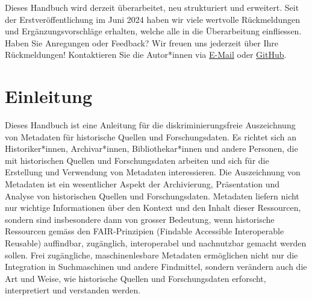\documentclass[
  letterpaper,
  DIV=11,
  numbers=noendperiod]{scrartcl}
\begin{document}
\begin{tcolorbox}[enhanced jigsaw, arc=.35mm, left=2mm, coltitle=black, leftrule=.75mm, bottomrule=.15mm, colframe=quarto-callout-important-color-frame, bottomtitle=1mm, colback=white, toprule=.15mm, toptitle=1mm, opacityback=0, colbacktitle=quarto-callout-important-color!10!white, breakable, rightrule=.15mm, titlerule=0mm, title=\textcolor{quarto-callout-important-color}{\faExclamation}\hspace{0.5em}{Hinweis zur anstehenden Überarbeitung des Handbuchs}, opacitybacktitle=0.6]

Dieses Handbuch wird derzeit überarbeitet, neu strukturiert und
erweitert. Seit der Erstveröffentlichung im Juni 2024 haben wir viele
wertvolle Rückmeldungen und Ergänzungsvorschläge erhalten, welche alle
in die Überarbeitung einfliessen. Haben Sie Anregungen oder Feedback?
Wir freuen uns jederzeit über Ihre Rückmeldungen! Kontaktieren Sie die
Autor*innen via
\href{https://maehr.github.io/diskriminierungsfreie-metadaten/}{E-Mail}
oder
\href{https://github.com/maehr/diskriminierungsfreie-metadaten/discussions/4\#discussioncomment-10626797}{GitHub}.

\end{tcolorbox}

\section{Einleitung}\label{einleitung}

Dieses Handbuch ist eine Anleitung für die diskriminierungsfreie
Auszeichnung von Metadaten für historische Quellen und Forschungsdaten.
Es richtet sich an Historiker*innen, Archivar*innen, Bibliothekar*innen
und andere Personen, die mit historischen Quellen und Forschungsdaten
arbeiten und sich für die Erstellung und Verwendung von Metadaten
interessieren. Die Auszeichnung von Metadaten ist ein wesentlicher
Aspekt der Archivierung, Präsentation und Analyse von historischen
Quellen und Forschungsdaten. Metadaten liefern nicht nur wichtige
Informationen über den Kontext und den Inhalt dieser Ressourcen, sondern
sind insbesondere dann von grosser Bedeutung, wenn historische
Ressourcen gemäss den FAIR-Prinzipien (Findable Accessible Interoperable
Reusable) auffindbar, zugänglich, interoperabel und nachnutzbar gemacht
werden sollen. Frei zugängliche, maschinenlesbare Metadaten ermöglichen
nicht nur die Integration in Suchmaschinen und andere Findmittel,
sondern verändern auch die Art und Weise, wie historische Quellen und
Forschungsdaten erforscht, interpretiert und verstanden werden.
\end{document}
